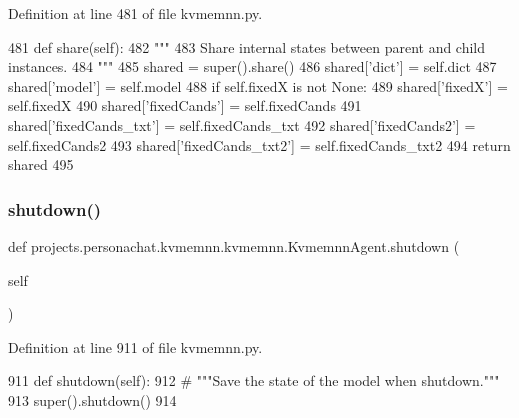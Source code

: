 Definition at line 481 of file kvmemnn.\+py.


\begin{DoxyCode}
481     \textcolor{keyword}{def }share(self):
482         \textcolor{stringliteral}{"""}
483 \textcolor{stringliteral}{        Share internal states between parent and child instances.}
484 \textcolor{stringliteral}{        """}
485         shared = super().share()
486         shared[\textcolor{stringliteral}{'dict'}] = self.dict
487         shared[\textcolor{stringliteral}{'model'}] = self.model
488         \textcolor{keywordflow}{if} self.fixedX \textcolor{keywordflow}{is} \textcolor{keywordflow}{not} \textcolor{keywordtype}{None}:
489             shared[\textcolor{stringliteral}{'fixedX'}] = self.fixedX
490             shared[\textcolor{stringliteral}{'fixedCands'}] = self.fixedCands
491             shared[\textcolor{stringliteral}{'fixedCands\_txt'}] = self.fixedCands\_txt
492             shared[\textcolor{stringliteral}{'fixedCands2'}] = self.fixedCands2
493             shared[\textcolor{stringliteral}{'fixedCands\_txt2'}] = self.fixedCands\_txt2
494         \textcolor{keywordflow}{return} shared
495 
\end{DoxyCode}
\mbox{\label{classprojects_1_1personachat_1_1kvmemnn_1_1kvmemnn_1_1KvmemnnAgent_a1e8a1089e7ecea911029c96d95f8b62a}} 
\subsubsection{\texorpdfstring{shutdown()}{shutdown()}}
{\footnotesize\ttfamily def projects.\+personachat.\+kvmemnn.\+kvmemnn.\+Kvmemnn\+Agent.\+shutdown (\begin{DoxyParamCaption}\item[{}]{self }\end{DoxyParamCaption})}



Definition at line 911 of file kvmemnn.\+py.


\begin{DoxyCode}
911     \textcolor{keyword}{def }shutdown(self):
912         \textcolor{comment}{# """Save the state of the model when shutdown."""}
913         super().shutdown()
914 
\end{DoxyCode}
\mbox{\label{classprojects_1_1personachat_1_1kvmemnn_1_1kvmemnn_1_1KvmemnnAgent_a0c38fac50edaf23833de870e37bccb97}} 
